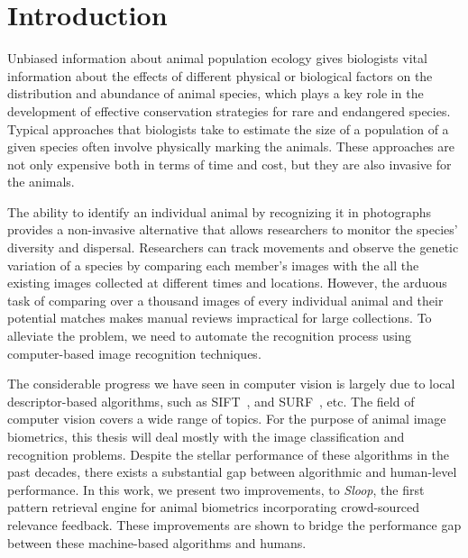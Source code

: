 
\chapter{Introduction}

Unbiased information about animal population ecology gives biologists vital
information about the effects of different physical or biological factors on
the distribution and abundance of animal species, which plays a key role in the
development of effective conservation strategies for rare and endangered
species. Typical approaches that biologists take to estimate the size of a
population of a given species often involve physically marking the animals. These
approaches are not only expensive both in terms of time and cost, but they are also
invasive for the animals.

The ability to identify an individual animal by recognizing it in photographs
provides a non-invasive alternative that allows researchers to monitor the
species' diversity and dispersal.
Researchers can track movements and observe the genetic
variation of a species by comparing each member's images with the all the
existing images collected at different times and locations. However, the
arduous task of comparing over a thousand images of every individual animal and
their potential matches makes manual reviews impractical for large
collections. To alleviate the problem, we need to automate the recognition
process using computer-based image recognition techniques.

The considerable progress we have seen in computer vision is largely due to
local descriptor-based algorithms, such as SIFT~\cite{lowe04}, and
SURF~\cite{surf08}, etc. The field of computer vision covers a wide range of
topics. For the purpose of animal image biometrics, this thesis will deal mostly
with the image classification and recognition problems. Despite the stellar
performance of these algorithms in the past decades, there exists a substantial
gap between algorithmic and human-level performance. In this work, we present two
improvements, to \emph{Sloop}, the first pattern retrieval engine for animal
biometrics incorporating crowd-sourced relevance feedback.
These improvements are shown to bridge the performance gap between these
machine-based algorithms and humans.

